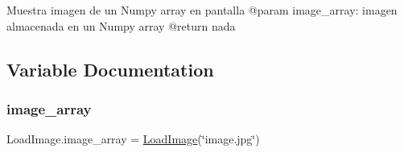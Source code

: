 \begin{DoxyVerb}Muestra imagen de un Numpy array en pantalla
@param image_array: imagen almacenada en un Numpy array
@return nada
\end{DoxyVerb}
 

\subsection{Variable Documentation}
\mbox{\label{namespace_load_image_ab6829fed4966d0d3dac4f1b77b47f3d4}} 
\subsubsection{\texorpdfstring{image\+\_\+array}{image\_array}}
{\footnotesize\ttfamily Load\+Image.\+image\+\_\+array = \mbox{\hyperlink{namespace_load_image_a6e3de0e286ea4f094dd609d99f15bd3c}{Load\+Image}}(\char`\"{}image.\+jpg\char`\"{})}

